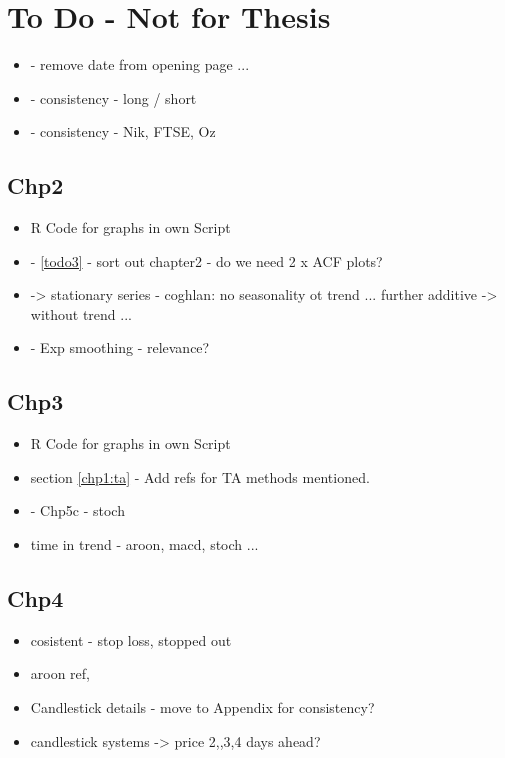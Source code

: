 
\chapter{To Do - Not for Thesis} %

\label{Chapter7} %




\begin{itemize}
\item - remove date from opening page ...
\item - consistency - long / short
\item - consistency - Nik, FTSE, Oz

\end{itemize}

\section{Chp2}
\begin{itemize}
\item R Code for graphs in own Script
\item - \ref{todo3} - sort out chapter2 - do we need 2 x ACF plots?
\item -> stationary series - coghlan: no seasonality ot trend ...  further additive -> without trend ...
\item - Exp smoothing - relevance?
\end{itemize}

\section{Chp3}
\begin{itemize}
\item R Code for graphs in own Script
\item section \ref{chp1:ta} - Add refs for TA methods mentioned.
\item  \cite{williams1989definitive} - Chp5c - stoch
\item time in trend - aroon, macd, stoch ...
\end{itemize}

\section{Chp4}
\begin{itemize}
\item cosistent - stop loss, stopped out
\item aroon ref, 
\item Candlestick details - move to Appendix for consistency?
\item candlestick systems -> price 2,,3,4 days ahead?
\end{itemize}

